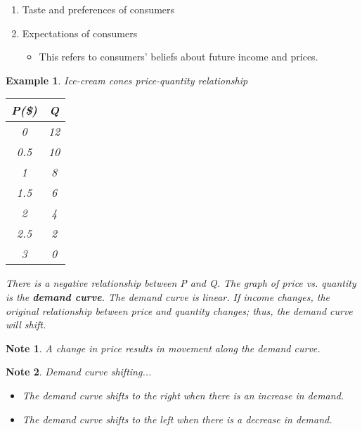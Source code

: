 \documentclass{article}
\newtheorem{example}{Example}[section]
\newtheorem{note}{Note}[section]
\newcommand{\bold}[1]{\textbf{#1}}
\newcommand{\define}[1]{\textbf{\textit{#1}}}
\begin{document}
\begin{enumerate}
\begin{itemize}
      \item When an increase in the price of one good causes the demand for another good to decrease, the two goods are called \define{complements}. 
      \item For example gasoline and big-cars can be considered \emph{complements} because as the price of gasoline increases, the demand for big-cars (that burn a lot of gas!) decreases. 
    \end{itemize}
  \item Taste and preferences of consumers 
  \item Expectations of consumers 
    \begin{itemize}
      \item This refers to consumers' beliefs about future income and prices.
    \end{itemize}
\end{enumerate} 

\begin{example}
  Ice-cream cones price-quantity relationship
  \begin{center}
    \begin{tabular}{ | c | c | }
      \hline
      \bold{P(\$)} & \bold{Q} \\
      \hline
      0 & 12 \\ 
      0.5 & 10 \\ 
      1 & 8 \\ 
      1.5 & 6 \\ 
      2 & 4 \\ 
      2.5 & 2 \\ 
      3 & 0 \\ 
      \hline 
    \end{tabular}
  \end{center}

  There is a \emph{negative relationship} between P and Q. The graph of price vs. quantity is the \bold{demand curve}. The \emph{demand curve} is linear. If income changes, the original relationship between price and quantity changes; thus, the demand curve will shift.

\end{example}

\begin{note}
  A change in price results in movement along the demand curve. 
\end{note}

\begin{note}
  Demand curve shifting...
  \begin{itemize}
    \item The demand curve shifts to the right when there is an increase in demand. 
    \item The demand curve shifts to the left when there is a decrease in demand.  
  \end{itemize}
\end{note}
\end{document}
